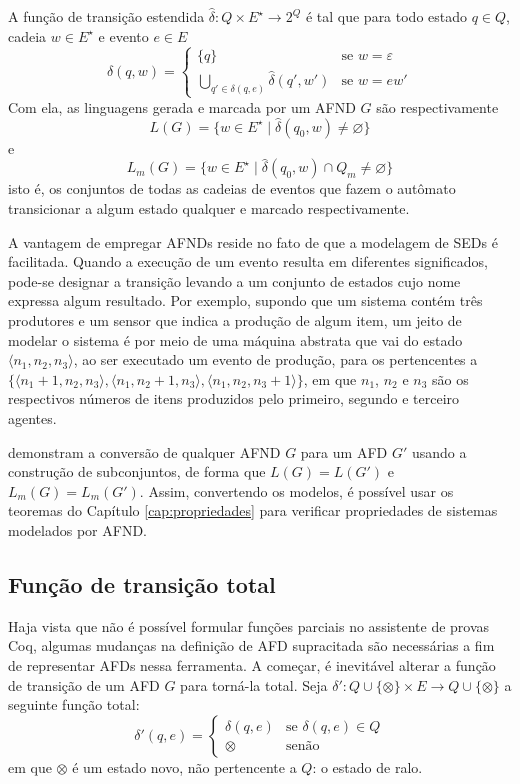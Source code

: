 A função de transição estendida $\hat{\delta} : Q \times E^\star \to 2^Q$ é tal que para todo estado $q \in Q$, cadeia $w \in E^\star$ e evento $e \in E$ $$\hat{\delta}(q, w) = \begin{cases}
\{ q \} & \text{se $w = \varepsilon$}\\
\displaystyle\bigcup_{q' \in \delta(q, e)} \hat{\delta}(q', w') & \text{se $w = ew'$}
\end{cases}$$ Com ela, as linguagens gerada e marcada por um AFND $G$ são respectivamente $$L(G) = \{ w \in E^\star \mid \hat{\delta}(q_0, w) \neq \varnothing \}$$ e $$L_m(G) = \{ w \in E^\star \mid \hat{\delta}(q_0, w) \cap Q_m \neq \varnothing \}$$ isto é, os conjuntos de todas as cadeias de eventos que fazem o autômato transicionar a algum estado qualquer e marcado respectivamente.

A vantagem de empregar AFNDs reside no fato de que a modelagem de SEDs é facilitada. Quando a execução de um evento resulta em diferentes significados, pode-se designar a transição levando a um conjunto de estados cujo nome expressa algum resultado. Por exemplo, supondo que um sistema contém três produtores e um sensor que indica a produção de algum item, um jeito de modelar o sistema é por meio de uma máquina abstrata que vai do estado $\langle n_1, n_2, n_3 \rangle$, ao ser executado um evento de produção, para os pertencentes a $\{ \langle n_1+1, n_2, n_3 \rangle, \langle n_1, n_2+1, n_3 \rangle, \langle n_1, n_2, n_3+1 \rangle \}$, em que $n_1$, $n_2$ e $n_3$ são os respectivos números de itens produzidos pelo primeiro, segundo e terceiro agentes.

 demonstram a conversão de qualquer AFND $G$ para um AFD $G'$ usando a construção de subconjuntos, de forma que $L(G) = L(G')$ e $L_m(G) = L_m(G')$. Assim, convertendo os modelos, é possível usar os teoremas do Capítulo \ref{cap:propriedades} para verificar propriedades de sistemas modelados por AFND.

\subsection{Função de transição total}

Haja vista que não é possível formular funções parciais no assistente de provas Coq, algumas mudanças na definição de AFD supracitada são necessárias a fim de representar AFDs nessa ferramenta. A começar, é inevitável alterar a função de transição de um AFD $G$ para torná-la total. Seja $\delta' : Q \cup \{ \otimes \} \times E \to Q \cup \{ \otimes \}$ a seguinte função total: $$\delta'(q, e) = \begin{cases}
\delta(q, e) & \text{se $\delta(q, e) \in Q$} \\
\otimes & \text{senão}
\end{cases}$$ em que $\otimes$ é um estado novo, não pertencente a $Q$: o estado de ralo.

